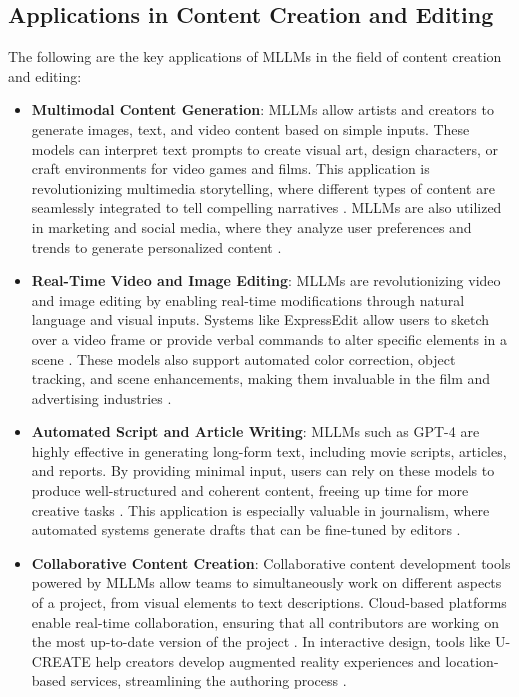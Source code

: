 \documentclass{article}
\begin{document}
\subsection{Applications in Content Creation and Editing}

The following are the key applications of MLLMs in the field of content creation and editing:

\begin{itemize}

\item \textbf{Multimodal Content Generation}: MLLMs allow artists and creators to generate images, text, and video content based on simple inputs. These models can interpret text prompts to create visual art, design characters, or craft environments for video games and films. This application is revolutionizing multimedia storytelling, where different types of content are seamlessly integrated to tell compelling narratives \cite{vs2024chang,vs2024schmidt}. MLLMs are also utilized in marketing and social media, where they analyze user preferences and trends to generate personalized content \cite{vs2020parde}.

\item \textbf{Real-Time Video and Image Editing}: MLLMs are revolutionizing video and image editing by enabling real-time modifications through natural language and visual inputs. Systems like ExpressEdit allow users to sketch over a video frame or provide verbal commands to alter specific elements in a scene \cite{vs2024tilekbay}. These models also support automated color correction, object tracking, and scene enhancements, making them invaluable in the film and advertising industries \cite{vs2024kubicek}.

\item \textbf{Automated Script and Article Writing}: MLLMs such as GPT-4 are highly effective in generating long-form text, including movie scripts, articles, and reports. By providing minimal input, users can rely on these models to produce well-structured and coherent content, freeing up time for more creative tasks \cite{vs2024eleftheriadis}. This application is especially valuable in journalism, where automated systems generate drafts that can be fine-tuned by editors \cite{vs2024anderson}.

\item \textbf{Collaborative Content Creation}: Collaborative content development tools powered by MLLMs allow teams to simultaneously work on different aspects of a project, from visual elements to text descriptions. Cloud-based platforms enable real-time collaboration, ensuring that all contributors are working on the most up-to-date version of the project \cite{vs2024santos}. In interactive design, tools like U-CREATE help creators develop augmented reality experiences and location-based services, streamlining the authoring process \cite{vs2024sauer}.


\end{itemize}
\end{document}
